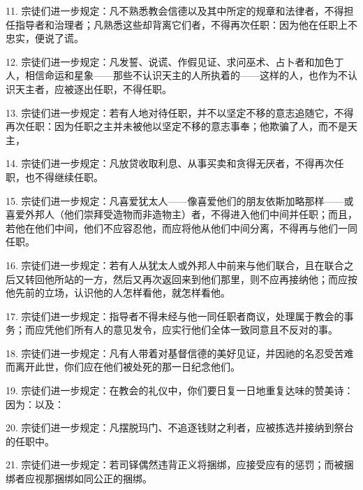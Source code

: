 11. 宗徒们进一步规定：凡不熟悉教会信德以及其中所定的规章和法律者，不得担任指导者和治理者；凡熟悉这些却背离它们者，不得再次任职：因为他在任职上不忠实，便说了谎。\par

12. 宗徒们进一步规定：凡发誓、说谎、作假见证、求问巫术、占卜者和加色丁人，相信命运和星象——那些不认识天主的人所执着的——这样的人，也作为不认识天主者，应被逐出任职，不得任职。\par

13. 宗徒们进一步规定：若有人地对待任职，并不以坚定不移的意志追随它，不得再次任职：因为任职之主并未被他以坚定不移的意志事奉；他欺骗了人，而不是天主，\par

14. 宗徒们进一步规定：凡放贷收取利息、从事买卖和贪得无厌者，不得再次任职，也不得继续任职。\par

15. 宗徒们进一步规定：凡喜爱犹太人——像喜爱他们的朋友依斯加略那样——或喜爱外邦人（他们崇拜受造物而非造物主）者，不得进入他们中间并任职；而且，若他在他们中间，他们不应容忍他，而应将他从他们中间分离，不得再与他们一同任职。\par

16. 宗徒们进一步规定：若有人从犹太人或外邦人中前来与他们联合，且在联合之后又转回他所站的一方，然后又再次返回来到他们那里，则不应再接纳他；而应按他先前的立场，认识他的人怎样看他，就怎样看他。\par

17. 宗徒们进一步规定：指导者不得未经与他一同任职者商议，处理属于教会的事务；而应凭他们所有人的意见发令，应实行他们全体一致同意且不反对的事。\par

18. 宗徒们进一步规定：凡有人带着对基督信德的美好见证，并因祂的名忍受苦难而离开此世，你们应在他们被处死的那一日纪念他们。\par

19. 宗徒们进一步规定：在教会的礼仪中，你们要日复一日地重复达味的赞美诗：因为：以及：\par

20. 宗徒们进一步规定：凡摆脱玛门、不追逐钱财之利者，应被拣选并接纳到祭台的任职中。\par

21. 宗徒们进一步规定：若司铎偶然违背正义将捆绑，应接受应有的惩罚；而被捆绑者应视那捆绑如同公正的捆绑。\par

